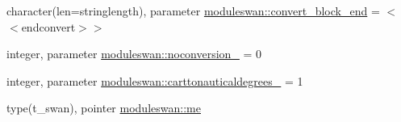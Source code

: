 \begin{DoxyCompactItemize}
\item 
character(len=stringlength), parameter \mbox{\hyperlink{namespacemoduleswan_a69adb794cbede34bda4634aadf1952e0}{moduleswan\+::convert\+\_\+block\+\_\+end}} = \textquotesingle{}$<$$<$endconvert$>$$>$\textquotesingle{}
\item 
integer, parameter \mbox{\hyperlink{namespacemoduleswan_a1dcf0fdd35dc9e5c127139d37e3eeed5}{moduleswan\+::noconversion\+\_\+}} = 0
\item 
integer, parameter \mbox{\hyperlink{namespacemoduleswan_a7dcf058a93532c9c6a8d2b3e0089c082}{moduleswan\+::carttonauticaldegrees\+\_\+}} = 1
\item 
type(t\+\_\+swan), pointer \mbox{\hyperlink{namespacemoduleswan_a0b7319827ebd8a624b35bfba2c2ff6e1}{moduleswan\+::me}}
\end{DoxyCompactItemize}
